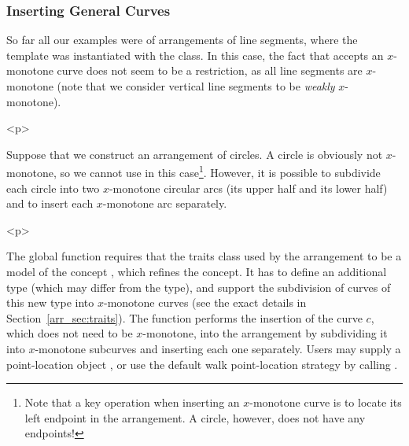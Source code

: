 \subsubsection{Inserting General Curves}
\label{arr_sssec:insert_gen}
%
So far all our examples were of arrangements of line segments,
where the  template was instantiated with the
 class. In this case, the fact that
 accepts an $x$-monotone curve does not
seem to be a restriction, as all line segments are $x$-monotone
(note that we consider vertical line segments to be {\em weakly}
$x$-monotone).

\begin{ccHtmlOnly}<p>\end{ccHtmlOnly}
Suppose that we construct an arrangement of circles. A circle is
obviously not $x$-monotone, so we cannot use
 in this case\footnote{Note that a key
operation when inserting an $x$-monotone curve is to locate its
left endpoint in the arrangement. A circle, however, does not have
any endpoints!}. However, it is possible to subdivide each circle
into two $x$-monotone circular arcs (its upper half and its lower
half) and to insert each $x$-monotone arc separately.

\begin{ccHtmlOnly}<p>\end{ccHtmlOnly}
The global function  requires that the traits class
used by the arrangement  to be a model of the concept
, which refines the
 concept. It has to define an
additional  type (which may differ from the
 type), and support the subdivision of curves
of this new type into $x$-monotone curves (see the exact details in
Section~\ref{arr_sec:traits}). The 
function performs the insertion of the curve $c$, which does not need
to be $x$-monotone, into the arrangement by subdividing it into
$x$-monotone subcurves and inserting each one separately. Users
may supply a point-location object , or use the default
walk point-location strategy by calling .

